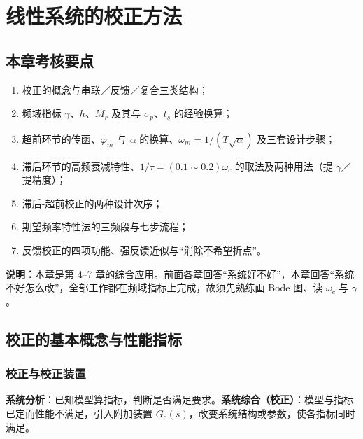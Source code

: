 \chapter{线性系统的校正方法}


\setlength{\parskip}{0.8ex plus 0.3ex minus 0.2ex}
\renewcommand{\arraystretch}{1.45}
\setlength{\tabcolsep}{9pt}

\bigskip

\section{本章考核要点}
\begin{enumerate}
    \item 校正的概念与串联／反馈／复合三类结构；
    \item 频域指标 $\gamma$、$h$、$M_r$ 及其与 $\sigma_p$、$t_s$ 的经验换算；
    \item 超前环节的传函、$\varphi_m$ 与 $\alpha$ 的换算、$\omega_m=1/(T\sqrt{\alpha})$ 及三套设计步骤；
    \item 滞后环节的高频衰减特性、$1/\tau=(0.1\sim0.2)\omega_c$ 的取法及两种用法（提 $\gamma$／提精度）；
    \item 滞后-超前校正的两种设计次序；
    \item 期望频率特性法的三频段与七步流程；
    \item 反馈校正的四项功能、强反馈近似与“消除不希望折点”。
\end{enumerate}
\noindent\textbf{说明：}本章是第 4--7 章的综合应用。前面各章回答“系统好不好”，本章回答“系统不好怎么改”，全部工作都在频域指标上完成，故须先熟练画 Bode 图、读 $\omega_c$ 与 $\gamma$。

\bigskip

\section{校正的基本概念与性能指标}

\subsection{校正与校正装置}
\textbf{系统分析}：已知模型算指标，判断是否满足要求。\textbf{系统综合（校正）}：模型与指标已定而性能不满足，引入附加装置 $G_c(s)$，改变系统结构或参数，使各指标同时满足。

